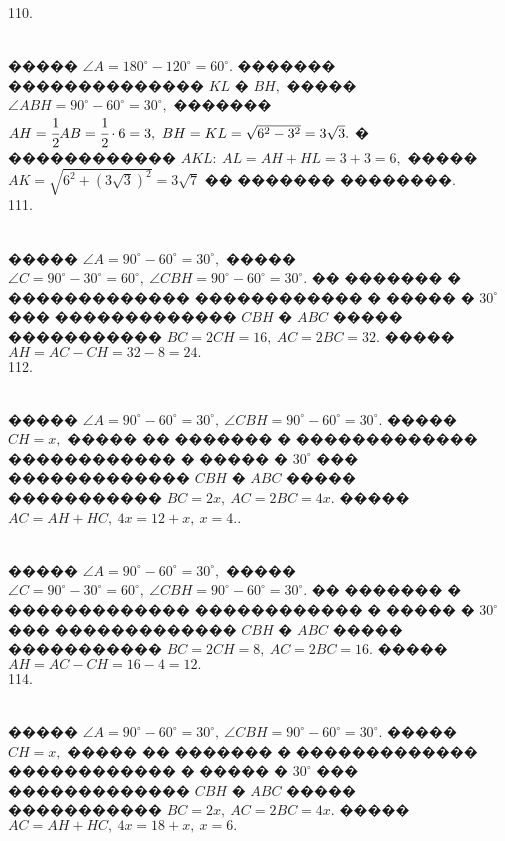 \documentclass[12pt]{article}
\begin{document}
110. \begin{figure}[ht!]
\end{figure}\\
����� $\angle A=180^\circ-120^\circ=60^\circ.$ ������� �������������� $KL$ � $BH,$ ����� $\angle ABH=90^\circ-60^\circ=30^\circ,$ ������� $AH=\cfrac{1}{2}AB=\cfrac{1}{2}\cdot6=3,\ BH=KL=\sqrt{6^2-3^2}=3\sqrt{3}.$ � ������������ $AKL:\ AL=AH+HL=3+3=6,$ ����� $AK=\sqrt{6^2+(3\sqrt{3})^2}=3\sqrt{7}$ �� ������� ��������.\\
111. \begin{figure}[ht!]
\end{figure}\\
����� $\angle A=90^\circ-60^\circ=30^\circ,$ ����� $\angle C=90^\circ-30^\circ=60^\circ,\ \angle CBH=90^\circ-60^\circ=30^\circ.$ �� ������� � ������������� ������������ � ����� � $30^\circ$ ��� ������������� $CBH$ � $ABC$ ����� ����������� $BC=2CH=16,\ AC=2BC=32.$ ����� $AH=AC-CH=32-8=24.$\\
112. \begin{figure}[ht!]
\end{figure}\\
����� $\angle A=90^\circ-60^\circ=30^\circ,\ \angle CBH=90^\circ-60^\circ=30^\circ.$ ����� $CH=x,$ ����� �� ������� � ������������� ������������ � ����� � $30^\circ$ ��� ������������� $CBH$ � $ABC$ ����� ����������� $BC=2x,\ AC=2BC=4x.$ ����� $AC=AH+HC,\ 4x=12+x,\ x=4.$\newpage{}. \begin{figure}[ht!]
\end{figure}\\
����� $\angle A=90^\circ-60^\circ=30^\circ,$ ����� $\angle C=90^\circ-30^\circ=60^\circ,\ \angle CBH=90^\circ-60^\circ=30^\circ.$ �� ������� � ������������� ������������ � ����� � $30^\circ$ ��� ������������� $CBH$ � $ABC$ ����� ����������� $BC=2CH=8,\ AC=2BC=16.$ ����� $AH=AC-CH=16-4=12.$\\
114. \begin{figure}[ht!]
\end{figure}\\
����� $\angle A=90^\circ-60^\circ=30^\circ,\ \angle CBH=90^\circ-60^\circ=30^\circ.$ ����� $CH=x,$ ����� �� ������� � ������������� ������������ � ����� � $30^\circ$ ��� ������������� $CBH$ � $ABC$ ����� ����������� $BC=2x,\ AC=2BC=4x.$ ����� $AC=AH+HC,\ 4x=18+x,\ x=6.$\\
\end{document}
